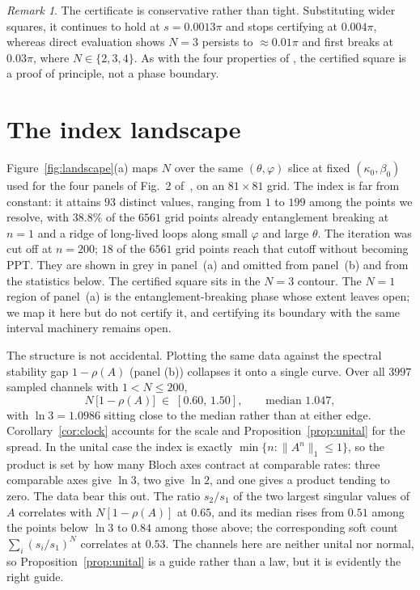 \documentclass[11pt,a4paper]{article}
\theoremstyle{definition}
\theoremstyle{remark}
\newtheorem{remark}[theorem]{Remark}
\begin{document}
\begin{remark}
The certificate is conservative rather than tight. Substituting wider squares,
it continues to hold at $s=0.0013\pi$ and stops certifying at $0.004\pi$,
whereas direct evaluation shows $N=3$ persists to $\approx0.01\pi$ and first
breaks at $0.03\pi$, where $N\in\{2,3,4\}$. As with the four properties of
\cite[Rem.~2]{PaperI}, the certified square is a proof of principle, not a
phase boundary.
\end{remark}

\section{The index landscape}
\label{sec:landscape}

Figure~\ref{fig:landscape}(a) maps $N$ over the same $(\theta,\varphi)$ slice
at fixed $(\kappa_{0},\beta_{0})$ used for the four panels of Fig.~2
of~\cite{PaperI}, on an
$81\times81$ grid. The index is far from constant: it attains $93$ distinct
values, ranging from $1$ to $199$ among the points we resolve, with $38.8\%$
of the $6561$ grid points already entanglement breaking at $n=1$ and a ridge of long-lived
loops along small $\varphi$ and large $\theta$. The iteration was cut off at
$n=200$; $18$ of the $6561$ grid points reach that cutoff without becoming PPT.
They are shown in grey in panel~(a) and omitted from panel~(b) and from the
statistics below. The certified square sits in the $N=3$ contour. The $N=1$ region of panel~(a)
is the entanglement-breaking phase whose extent \cite[Sec.~X]{PaperI} leaves
open; we map it here but do not certify it, and certifying its boundary with
the same interval machinery remains open.



The structure is not accidental. Plotting the same data against the spectral
stability gap $1-\rho(A)$ (panel (b)) collapses it onto a single curve. Over
all $3997$ sampled channels with $1<N\le200$,
\begin{equation}\label{eq:oneclock}
  N\,\bigl[1-\rho(A)\bigr]\;\in\;[0.60,\,1.50],
  \qquad \text{median } 1.047,
\end{equation}
with $\ln3=1.0986$ sitting close to the median rather than at either edge.
Corollary~\ref{cor:clock} accounts for the scale and
Proposition~\ref{prop:unital} for the spread. In the unital case the index is
exactly $\min\{n:\|A^{n}\|_{1}\le1\}$, so the product is set by how many Bloch
axes contract at comparable rates: three comparable axes give $\ln3$, two give
$\ln2$, and one gives a product tending to zero. The data bear this out. The
ratio $s_{2}/s_{1}$ of the two largest singular values of $A$ correlates with
$N[1-\rho(A)]$ at $0.65$, and its median rises from $0.51$ among the points
below $\ln3$ to $0.84$ among those above; the corresponding soft count
$\sum_{i}(s_{i}/s_{1})^{N}$ correlates at $0.53$. The channels here are neither
unital nor normal, so Proposition~\ref{prop:unital} is a guide rather than a
law, but it is evidently the right guide.
\end{document}
